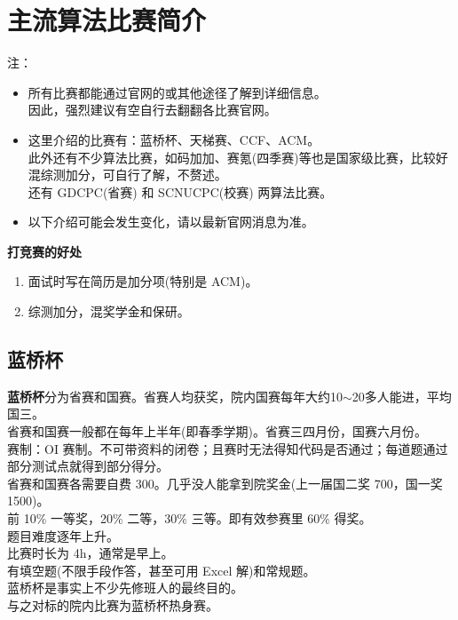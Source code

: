 \documentclass{beamer}
\begin{document}
\section{主流算法比赛简介}
\begin{frame}
    \begin{alertblock}{注：}
        \begin{itemize}
            \item 所有比赛都能通过官网的或其他途径了解到详细信息。\\
            因此，强烈建议有空自行去翻翻各比赛官网。
            \item 这里介绍的比赛有：蓝桥杯、天梯赛、CCF、ACM。\\
            此外还有不少算法比赛，如码加加、赛氪(四季赛)等也是国家级比赛，比较好混综测加分，可自行了解，不赘述。\\
            还有 GDCPC(省赛) 和 SCNUCPC(校赛) 两算法比赛。
            \item 以下介绍可能会发生变化，请以最新官网消息为准。
        \end{itemize}
    \end{alertblock}
    \large{\textbf{\color[RGB]{37, 149, 68}打竞赛的好处}}
    \begin{enumerate}
        \item 面试时写在简历是加分项(特别是 ACM)。
        \item 综测加分，混奖学金和保研。
    \end{enumerate}
\end{frame}

\subsection{蓝桥杯}
\begin{frame}
    \textbf{\color[RGB]{34, 166, 242}蓝桥杯}分为省赛和国赛。省赛人均获奖，院内国赛每年大约10$\sim$20多人能进，平均国三。\\
    省赛和国赛一般都在每年上半年(即春季学期)。省赛三四月份，国赛六月份。\\
    赛制：OI 赛制。不可带资料的闭卷；且赛时无法得知代码是否通过；每道题通过部分测试点就得到部分得分。\\
    省赛和国赛各需要自费 300。几乎没人能拿到院奖金(上一届国二奖 700，国一奖 1500)。\\
    前 10\% 一等奖，20\% 二等，30\% 三等。即有效参赛里 60\% 得奖。\\
    题目难度逐年上升。\\
    比赛时长为 4h，通常是早上。\\
    有填空题(不限手段作答，甚至可用 Excel 解)和常规题。\\
    蓝桥杯是事实上不少先修班人的最终目的。\\
    与之对标的院内比赛为蓝桥杯热身赛。
\end{frame}
\end{document}
